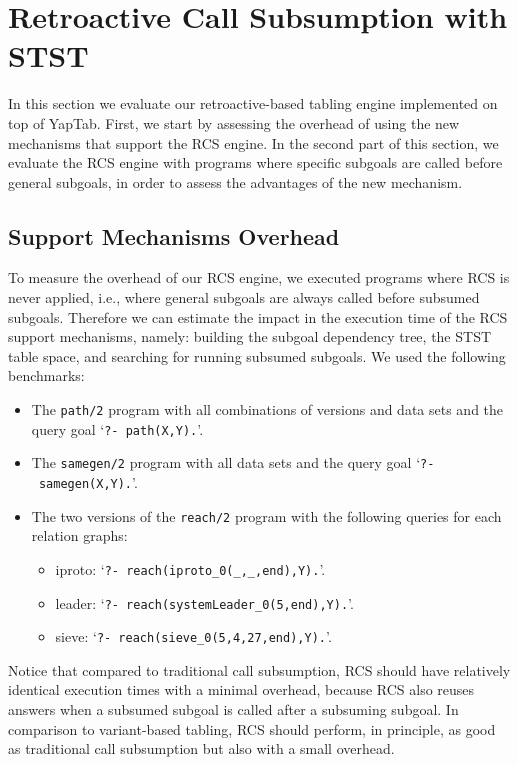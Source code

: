 \section{Retroactive Call Subsumption with STST}

In this section we evaluate our retroactive-based tabling engine implemented on
top of YapTab. First, we start by assessing the overhead of using the new mechanisms that
support the RCS engine. In the second part of this section, we evaluate
the RCS engine with programs where specific subgoals are called before general subgoals, in
order to assess the advantages of the new mechanism.

\subsection{Support Mechanisms Overhead}

To measure the overhead of our RCS engine, we executed programs where RCS is never applied, i.e., where
general subgoals are always called before subsumed subgoals. Therefore we can estimate the impact in the
execution time of the RCS support mechanisms, namely: building the subgoal dependency tree, the STST table space,
and searching for running subsumed subgoals.
We used the following benchmarks:

\begin{itemize}
   \item The \texttt{path/2} program with all combinations of versions and data sets and the query goal `\texttt{?-~path(X,Y).}'.
   
   \item The \texttt{samegen/2} program with all data sets and the query goal `\texttt{?-~samegen(X,Y).}'.
   
   \item The two versions of the \texttt{reach/2} program with the following queries for each relation graphs:

   \begin{itemize}
      \item iproto: `\texttt{?-~reach(iproto\_0(\_,\_,end),Y).}'.
      \item leader: `\texttt{?-~reach(systemLeader\_0(5,end),Y).}'.
      \item sieve: `\texttt{?-~reach(sieve\_0(5,4,27,end),Y).}'.
   \end{itemize}

\end{itemize}

Notice that compared to traditional call subsumption, RCS should have
relatively identical execution times with a minimal overhead, because RCS also reuses answers when a subsumed subgoal is
called after a subsuming subgoal. In comparison to variant-based tabling, RCS should perform, in principle,
as good as traditional call subsumption but also with a small overhead.


